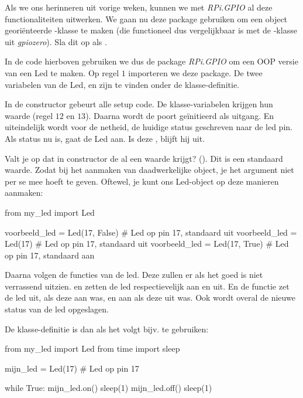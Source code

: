 Als we ons herinneren uit vorige weken, kunnen we met \textit{RPi.GPIO} al deze functionaliteiten uitwerken. We gaan nu deze package gebruiken om een object georiënteerde -klasse te maken (die functioneel dus vergelijkbaar is met de -klasse uit \textit{gpiozero}). Sla dit op als .


In de code hierboven gebruiken we dus de package \textit{RPi.GPIO} om een OOP versie van een Led te maken. Op regel $1$ importeren we deze package. De twee variabelen van de Led,  en  zijn te vinden onder de klasse-definitie. 

In de constructor gebeurt alle setup code. De klasse-variabelen krijgen hun waarde (regel $12$ en $13$). Daarna wordt de poort geïnitieerd als uitgang. En uiteindelijk wordt voor de netheid, de huidige status geschreven naar de led pin. Als status nu  is, gaat de Led aan. Is deze , blijft hij uit.
\begin{remark}
Valt je op dat in constructor de  al een waarde krijgt? (). Dit is een standaard waarde. Zodat bij het aanmaken van daadwerkelijke object, je het argument  niet per se mee hoeft te geven. Oftewel, je kunt ons Led-object op deze manieren aanmaken:
\begin{python}
from my_led import Led

voorbeeld_led = Led(17, False)  # Led op pin 17, standaard uit  
voorbeeld_led = Led(17)         # Led op pin 17, standaard uit  
voorbeeld_led = Led(17, True)   # Led op pin 17, standaard aan  
\end{python}
\end{remark}
Daarna volgen de functies van de led. Deze zullen er als het goed is niet verrassend uitzien.  en  zetten de led respectievelijk aan en uit. En de  functie zet de led uit, als deze aan was, en aan als deze uit was. Ook wordt overal de nieuwe status van de led opgeslagen. 

De klasse-definitie is dan als het volgt bijv. te gebruiken:
\begin{python}
from my_led import Led
from time import sleep

mijn_led = Led(17)  # Led op pin 17

while True:
  mijn_led.on()
  sleep(1)
  mijn_led.off()
  sleep(1)
\end{python}

